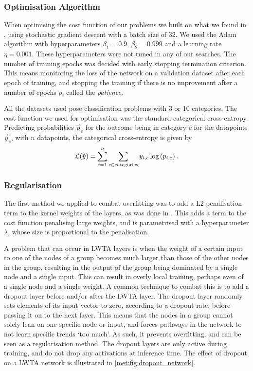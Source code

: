     \subsubsection{Optimisation Algorithm}
        When optimising the cost function of our problems we built on what we found in \citep{Project2}, using stochastic gradient descent with a batch size of 32. We used the Adam algorithm with hyperparameters $\beta_1 = 0.9$, $\beta_2 = 0.999$ and a learning rate $\eta = 0.001$. These hyperparameters were not tuned in any of our searches. The number of training epochs was decided with early stopping termination criterion. This means monitoring the loss of the network on a validation dataset after each epoch of training, and stopping the training if there is no improvement after a number of epochs $p$, called the \textit{patience}.

        All the datasets used pose classification problems with 3 or 10 categories. The cost function we used for optimisation was the standard categorical cross-entropy. Predicting probabilities $\vec{p}_c$ for the outcome being in category $c$ for the datapoints $\vec{y}_c$, with $n$ datapoints, the categorical cross-entropy is given by
        \begin{align}
            \mathcal{L}(\tilde{y}) = \sum_{i=1}^n \sum_{c \in \mathrm{categories}} y_{i,c} \log\left(p_{i,c}\right).
        \end{align}


    \subsubsection{Regularisation}
        The first method we applied to combat overfitting was to add a L2 penalisation term to the kernel weights of the layers, as was done in \cite{Project2}. This adds a term to the cost function penalising large weights, and is parametrised with a hyperparameter $\lambda$, whose size is proportional to the penalisation.

        A problem that can occur in LWTA layers is when the weight of a certain input to one of the nodes of a group becomes much larger than those of the other nodes in the group, resulting in the output of the group being dominated by a single node and a single input. This can result in overly local training, perhaps even of a single node and a single weight. A common technique to combat this is to add a dropout layer before and/or after the LWTA layer. The dropout layer randomly sets elements of its input vector to zero, according to a dropout rate, before passing it on to the next layer. This means that the nodes in a group cannot solely lean on one specific node or input, and forces pathways in the network to not learn specific trends `too much'. As such, it prevents overfitting, and can be seen as a regularisation method. The dropout layers are only active during training, and do not drop any activations at inference time. The effect of dropout on a LWTA network is illustrated in \cref{met:fig:dropout_network}.

